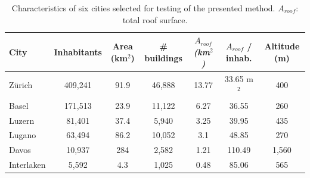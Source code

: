 \begin{table}[thb]
\centering
\footnotesize
\caption{Characteristics of six cities selected for testing of the presented method. $A_{roof}$: total roof surface.}
\label{tab:chile_cities}
\begin{tabular}{lcccccc}
\hline
\textbf{City} & \textbf{Inhabitants} & \textbf{Area (km$^2$)} & \textbf{\# buildings} & \textit{\textbf{$A_{roof}$ (km$^2$)}} & \textbf{$A_{roof}$ / inhab.} & \textbf{Altitude (m)} \\ \hline
Zürich        & 409,241              & 91.9                & 46,888                & 13.77                         & 33.65 m$^2$                & 400                   \\
Basel         & 171,513              & 23.9                & 11,122                & 6.27                          & 36.55                   & 260                   \\
Luzern        & 81,401               & 37.4                & 5,940                 & 3.25                          & 39.95                   & 435                   \\
Lugano        & 63,494               & 86.2                & 10,052                & 3.1                           & 48.85                   & 270                   \\
Davos         & 10,937               & 284                 & 2,582                 & 1.21                          & 110.49                  & 1,560                 \\
Interlaken    & 5,592                & 4.3                 & 1,025                 & 0.48                          & 85.06                   & 565                   \\ \hline
\end{tabular}
\end{table}


